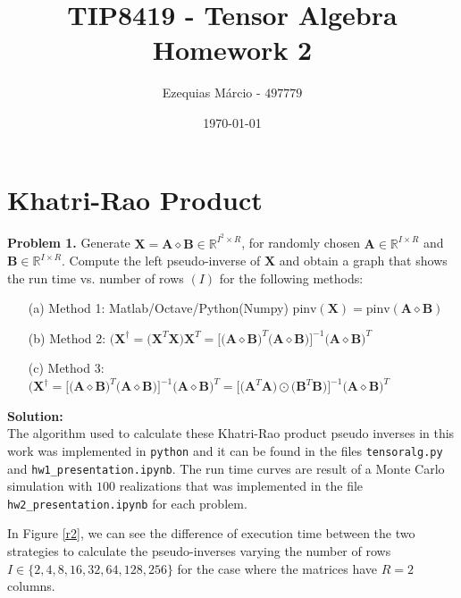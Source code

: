 \documentclass[12pt]{article}
\title{TIP8419 - Tensor Algebra\\ 
       Homework 2}
\author{Ezequias Márcio - $497779$}
\date{\today}
\begin{document}
\maketitle

\section*{Khatri-Rao Product}\vspace{.5cm}

\noindent
\textbf{Problem 1.} Generate $\bm{X} = \bm{A}\diamond\bm{B} \in 
\mathbb{R}^{I^2 \times R}$, for randomly chosen  
$\bm{A} \in \mathbb{R}^{I\times R}$ and $\bm{B}\in \mathbb{R}^{I\times R}$. 
Compute the left pseudo-inverse of $\bm{X}$ and obtain a graph that shows the 
run time vs. number of rows $(I) $ for the following methods:

\begin{itemize}
    \item [(a)] Method 1: Matlab/Octave/Python(Numpy) $\text{pinv}(\bm{X})= 
    \text{pinv}(\bm{A}\diamond \bm{B})$

    \item [(b)] Method 2: $(\bm{X}^{\dagger} = \big( \bm{X}^T\bm{X}\big) 
    \bm{X}^T = \big[\big(  \bm{A}\diamond \bm{B} \big)^T
    \big(  \bm{A}\diamond \bm{B} \big)
    \big]^{-1}\big( \bm{A}\diamond \bm{B} \big)^T$\\
    
    \item [(c)] Method 3: $(\bm{X}^{\dagger} =
    \big[\big(  \bm{A}\diamond \bm{B} \big)^T
    \big(  \bm{A}\diamond \bm{B} \big)
    \big]^{-1}\big( \bm{A}\diamond \bm{B} \big)^T = 
    \big[\big( \bm{A}^T \bm{A} \big) \odot
    \big(  \bm{B}^T \bm{B} \big)\big]^{-1}
    \big( \bm{A}\diamond \bm{B} \big)^T$
\end{itemize}

\noindent \textbf{Solution:}\\

The algorithm used to calculate these Khatri-Rao product pseudo inverses in 
this work was implemented in \texttt{python} and it can be found in the files 
\texttt{tensoralg.py} and \texttt{hw1\_presentation.ipynb}. 
The run time curves are result of a Monte Carlo simulation with 
$100$ realizations that was implemented in the file 
\texttt{hw2\_presentation.ipynb} for each problem.

In Figure \ref{r2}, we can see the difference of execution time between 
the two strategies to calculate the pseudo-inverses varying the number of rows 
$I \in \{2,4,8,16,32,64,128,256\}$ for the case where the matrices have $R = 2$ 
columns.
\end{document}
